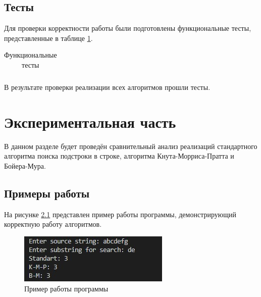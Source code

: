 \documentclass[12pt, a4paper]{report}
\begin{document}
	\newpage

	\section{Тесты}
	Для проверки корректности работы были подготовлены функциональные тесты, представленные в таблице \ref{unit-tests}.

	\begin{table}[ht!]
		\caption{Функциональные тесты}
		\label{unit-tests}
		\begin{center}
			\begin{tabular}{|c|c|c|}
			
			\end{tabular}
		\end{center}
	\end{table}

	В результате проверки реализации всех алгоритмов прошли тесты.

	\chapter{Экспериментальная часть}
	В данном разделе будет проведён сравнительный анализ реализаций стандартного алгоритма поиска подстроки в строке, алгоритма Кнута-Морриса-Пратта и Бойера-Мура.
	\section{Примеры работы}
	На рисунке \ref{pic:example} представлен пример работы программы, демонстрирующий корректную работу алгоритмов.
	\begin{figure}[ht!]
		\centering
		\includegraphics[scale=1]{img/example.jpg}
		\caption{Пример работы программы}
		\label{pic:example}
	\end{figure}
	
\end{document}
